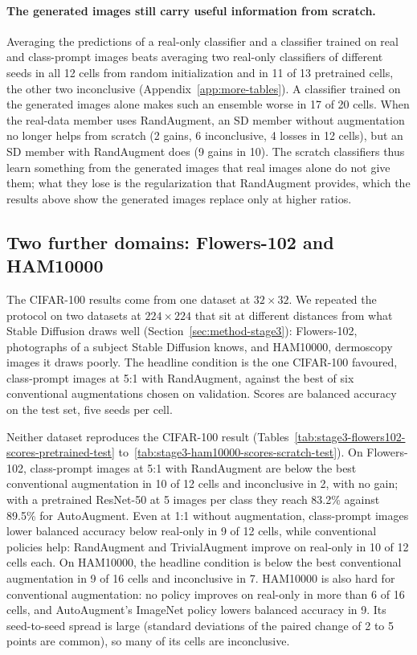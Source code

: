 \paragraph{The generated images still carry useful information from scratch.}
Averaging the predictions of a real-only classifier and a classifier trained on real and class-prompt images
beats averaging two real-only classifiers of different seeds in all 12 cells from random initialization and
in 11 of 13 pretrained cells, the other two inconclusive (Appendix~\ref{app:more-tables}). A classifier
trained on the generated images alone makes such an ensemble worse in 17 of 20 cells. When the
real-data member uses RandAugment, an SD member without augmentation no longer helps from scratch (2 gains,
6 inconclusive, 4 losses in 12 cells), but an SD member with RandAugment does (9 gains in 10). The scratch
classifiers thus learn something from the generated images that real images alone do not give them; what
they lose is the regularization that RandAugment provides, which the results above show the generated
images replace only at higher ratios.

\subsection{Two further domains: Flowers-102 and HAM10000}
\label{sec:results-stage3}
The CIFAR-100 results come from one dataset at $32\times32$. We repeated the protocol on two datasets at
$224\times224$ that sit at different distances from what Stable Diffusion draws well
(Section~\ref{sec:method-stage3}): Flowers-102, photographs of a subject Stable Diffusion knows, and HAM10000,
dermoscopy images it draws poorly. The headline condition is the one CIFAR-100 favoured, class-prompt images at
5:1 with RandAugment, against the best of six conventional augmentations chosen on validation. Scores are
balanced accuracy on the test set, five seeds per cell.

Neither dataset reproduces the CIFAR-100 result (Tables~\ref{tab:stage3-flowers102-scores-pretrained-test}
to~\ref{tab:stage3-ham10000-scores-scratch-test}). On Flowers-102, class-prompt images at 5:1 with RandAugment
are below the best conventional augmentation in 10 of 12 cells and inconclusive in 2, with no gain; with a
pretrained ResNet-50 at 5 images per class they reach 83.2\% against 89.5\% for AutoAugment. Even at 1:1 without
augmentation, class-prompt images lower balanced accuracy below real-only in 9 of 12 cells, while conventional
policies help: RandAugment and TrivialAugment improve on real-only in 10 of 12 cells each. On HAM10000, the
headline condition is below the best conventional augmentation in 9 of 16 cells and inconclusive in 7.
HAM10000 is also hard for conventional augmentation: no policy improves on real-only in more than 6 of 16
cells, and AutoAugment's ImageNet policy lowers balanced accuracy in 9. Its seed-to-seed spread is large
(standard deviations of the paired change of 2 to 5 points are common), so many of its cells are
inconclusive.

